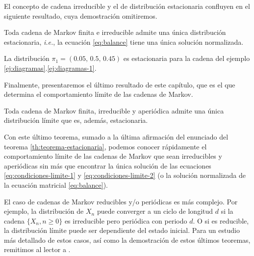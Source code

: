 El concepto de cadena irreducible y el de distribución estacionaria confluyen en el siguiente resultado, cuya demostración omitiremos.

\begin{teorema}
    \label{th:teorema-estacionaria}
    Toda cadena de Markov finita e irreducible admite una única distribución estacionaria, \textit{i.e.}, la ecuación \eqref{eq:balance} tiene una única solución normalizada.
\end{teorema}

\begin{ejemplo}
    La distribución $\pi_1 = \left(0.05,\, 0.5,\, 0.45\right)$ es estacionaria para la cadena del ejemplo \ref{ej:diagramas}.\ref{ej:diagramas-1}.
\end{ejemplo}

Finalmente, presentaremos el último resultado de este capítulo, que es el que determina el comportamiento límite de las cadenas de Markov.

\begin{teorema}
    \label{th:teorema-limite}
    Toda cadena de Markov finita, irreducible y aperiódica admite una única distribución límite que es, además, estacionaria.
\end{teorema}

Con este último teorema, sumado a la última afirmación del enunciado del teorema \ref{th:teorema-estacionaria}, podemos conocer rápidamente el comportamiento límite de las cadenas de Markov que sean irreducibles y aperiódicas sin más que encontrar la única solución de las ecuaciones \eqref{eq:condiciones-limite-1} y \eqref{eq:condiciones-limite-2} (o la solución normalizada de la ecuación matricial \eqref{eq:balance}). 

El caso de cadenas de Markov reducibles y/o periódicas es más complejo. Por ejemplo, la distribución de $X_n$ puede converger a un ciclo de longitud $d$ si la cadena $\{X_n, n\geq 0\}$ es irreducible pero periódica con periodo $d$. O si es reducible, la distribución límite puede ser dependiente del estado inicial. Para un estudio más detallado de estos casos, así como la demostración de estos últimos teoremas, remitimos al lector a \cite[Ch. II, Sections 4.2 and 4.3]{Ross}.

